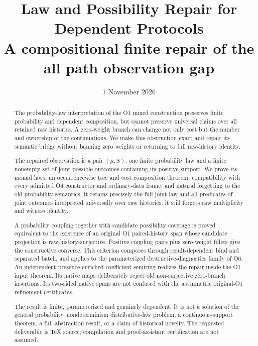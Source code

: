 \documentclass[11pt,a4paper]{article}
\title{Law and Possibility Repair for Dependent Protocols\\[5pt]
\large A compositional finite repair of the all path observation gap}
\date{1 November 2026}
\theoremstyle{definition}
\begin{document}
\maketitle

\begin{abstract}
The probability-law interpretation of the O1 mixed construction preserves
finite probability and dependent composition, but cannot preserve universal
claims over all retained raw histories. A zero-weight branch can change
not only cost but the number and ownership of the continuations. We make
this obstruction exact and repair its semantic bridge without banning
zero weights or returning to full raw-history identity.

The repaired observation is a pair $(\mu,S)$: one finite probability law
and a finite nonempty set of joint possible outcomes containing its
positive support. We prove its monad laws, an occurrencewise tree and cost
composition theorem, compatibility with every admitted O4 constructor
and ordinary-data frame, and natural forgetting to the old probability
semantics. It retains precisely the full joint law and all predicates of
joint outcomes interpreted universally over raw histories; it still
forgets raw multiplicity and witness identity.

A probability coupling together with candidate possibility coverage is
proved equivalent to the existence of an original O1 paired-history span
whose candidate projection is raw-history-surjective. Positive coupling
pairs plus zero-weight fillers give the constructive converse. This
criterion composes through result-dependent bind and separated batch,
and applies to the parameterized destructive-diagnostics family of O6.
An independent presence-enriched coefficient semiring realizes the repair
inside the O1 input theorem. Its native maps deliberately reject old
non-surjective zero-branch insertions. Its two-sided native spans are not
confused with the asymmetric original-O1 refinement certificates.

The result is finite, parameterized and genuinely dependent. It is not a
solution of the general probability--nondeterminism distributive-law
problem, a continuous-support theorem, a full-abstraction result, or a
claim of historical novelty. The requested deliverable is TeX source;
compilation and proof-assistant certification are not assumed.
\end{abstract}
\tableofcontents
\end{document}
